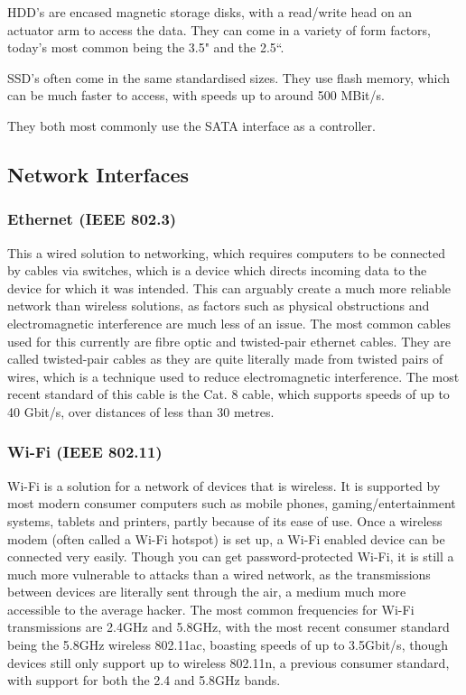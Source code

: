 HDD's are encased magnetic storage disks, with a read/write head on an actuator arm to access the data. They can come in a variety of form factors, today's most common being the 3.5" and the 2.5``.

SSD's often come in the same standardised sizes. They use flash memory, which can be much faster to access, with speeds up to around 500 MBit/s.

They both most commonly use the SATA interface as a controller.

\hypertarget{network-interfaces}{%
\subsection{Network Interfaces}\label{network-interfaces}}

\hypertarget{ethernet-ieee-802.3}{%
\subsubsection{Ethernet (IEEE 802.3)}\label{ethernet-ieee-802.3}}

This a wired solution to networking, which requires computers to be connected by cables via switches, which is a device which directs incoming data to the device for which it was intended. This can arguably create a much more reliable network than wireless solutions, as factors such as physical obstructions and electromagnetic interference are much less of an issue. The most common cables used for this currently are fibre optic and twisted-pair ethernet cables. They are called twisted-pair cables as they are quite literally made from twisted pairs of wires, which is a technique used to reduce electromagnetic interference. The most recent standard of this cable is the Cat. 8 cable, which supports speeds of up to 40 Gbit/s, over distances of less than 30 metres.

\hypertarget{wi-fi-ieee-802.11}{%
\subsubsection{Wi-Fi (IEEE 802.11)}\label{wi-fi-ieee-802.11}}

Wi-Fi is a solution for a network of devices that is wireless. It is supported by most modern consumer computers such as mobile phones, gaming/entertainment systems, tablets and printers, partly because of its ease of use. Once a wireless modem (often called a Wi-Fi hotspot) is set up, a Wi-Fi enabled device can be connected very easily. Though you can get password-protected Wi-Fi, it is still a much more vulnerable to attacks than a wired network, as the transmissions between devices are literally sent through the air, a medium much more accessible to the average hacker. The most common frequencies for Wi-Fi transmissions are 2.4GHz and 5.8GHz, with the most recent consumer standard being the 5.8GHz wireless 802.11ac, boasting speeds of up to 3.5Gbit/s, though devices still only support up to wireless 802.11n, a previous consumer standard, with support for both the 2.4 and 5.8GHz bands.

